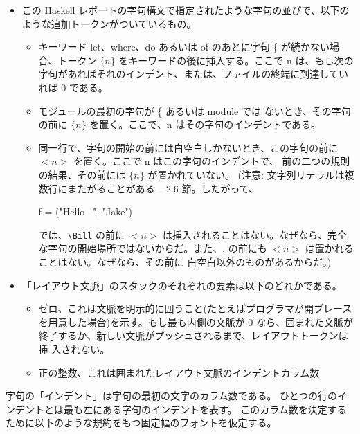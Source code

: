 \documentclass[mingoth,a4paper]{jsarticle}
\begin{document}
\begin{itemize}

    \item この Haskell レポートの字句構文で指定されたような字句の並びで、以下のような追加トークンがついているもの。

    \begin{itemize}
          \item キーワード let、where、do あるいは of のあとに字句 \{ が続かない場合、トークン $\{n\}$ をキーワードの後に挿入する。ここで n は、もし次の字句があればそれのインデント、または、ファイルの終端に到達していれば 0 である。
          \item モジュールの最初の字句が \{ あるいは module では ないとき、その字句の前に $\{n\}$ を置く。ここで、n はその字句のインデントである。
          \item 同一行で、字句の開始の前には白空白しかないとき、この字句の前に $<n>$ を置く。ここで n はこの字句のインデントで、 前の二つの規則の結果、その前には $\{n\}$ が置かれていない。 (注意: 文字列リテラルは複数行にまたがることがある -- 2.6 節。したがって、
\begin{commandline}
              f = ("Hello \
                      \Bill", "Jake")
\end{commandline}
            では、\verb|\Bill| の前に $<n>$ は挿入されることはない。なぜなら、完全な字句の開始場所ではないからだ。また、, の前にも $<n>$ は置かれることはない。なぜなら、その前に 白空白以外のものがあるからだ。)
    \end{itemize}

    \item「レイアウト文脈」のスタックのそれぞれの要素は以下のどれかである。

    \begin{itemize}
          \item ゼロ、これは文脈を明示的に囲うこと(たとえばプログラマが開ブレース を用意した場合)を示す。もし最も内側の文脈が 0 なら、囲まれた文脈が 終了するか、新しい文脈がプッシュされるまで、レイアウトトークンは挿 入されない。
          \item 正の整数、これは囲まれたレイアウト文脈のインデントカラム数
    \end{itemize}

\end{itemize}

字句の「インデント」は字句の最初の文字のカラム数である。
ひとつの行のインデントとは最も左にある字句のインデントを表す。
このカラム数を決定するために以下のような規約をもつ固定幅のフォントを仮定する。
\end{document}
